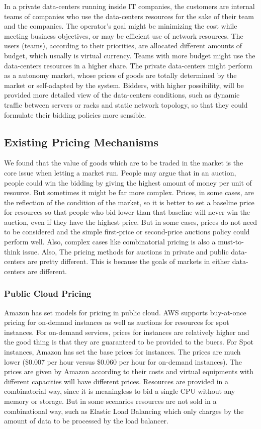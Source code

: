 \documentclass[a4paper,11pt,twocolumn]{article}
\begin{document}
In a private data-centers running inside IT companies, the customers are internal teams of companies who use the data-centers resources for the sake of their team and the companies.
The operator's goal might be minimizing the cost while meeting business objectives, or may be efficient use of network resources. The users (teams), according to their priorities,
are allocated different amounts of budget, which usually is virtual currency. Teams with more budget might use the data-centers resources in a higher share. The private data-centers 
might perform as a autonomy market, whose prices of goods are totally determined by the market or self-adapted by the system. Bidders, with higher possibility, will be
provided more detailed view of the data-centers conditions, such as dynamic traffic between servers or racks and static network topology, so that they could formulate their 
bidding policies more sensible. 
\subsection{Existing Pricing Mechanisms}
We found that the value of goods which are to be traded in the market is the core issue when letting a market run. People may argue that in an auction,
people could win the bidding by giving the highest amount of money per unit of resource. But sometimes it might be far more complex. Prices, in some cases,
are the reflection of the condition of the market, so it is better to set a baseline price for resources so that people who bid lower than that baseline will
never win the auction, even if they have the highest price. But in some cases, prices do not need  to be considered and the simple first-price or second-price auctions
policy could perform well. Also, complex cases like combinatorial pricing\cite{combinatorial auction} is also a must-to-think issue. Also, 
The pricing methods for auctions in private and public data-centers are pretty different. This is because the goals of markets in either data-centers are 
different. 
\subsubsection{Public Cloud Pricing}
Amazon\cite{aws} has set models for pricing in public cloud. AWS supports buy-at-once pricing for on-demand instances as well as auctions for resources
for spot instances. For on-demand services, prices for instances are relatively higher and the good thing is that they are guaranteed to be provided to the buers.
For Spot instances\cite{spot}, Amazon has set the base prices for instances. The prices are much lower (\$0.007 per hour versus \$0.060 per hour for on-demand instances).
The prices are given by Amazon according to their costs and virtual equipments with different capacities will have different prices. Resources
are provided in a combinatorial way, since it is meaningless to bid a single CPU without any memory or storage. But in some scenarios resources are not 
sold in a combinational way, such as Elastic Load Balancing which only charges by the amount of data to be processed by the load balancer.
\end{document}
